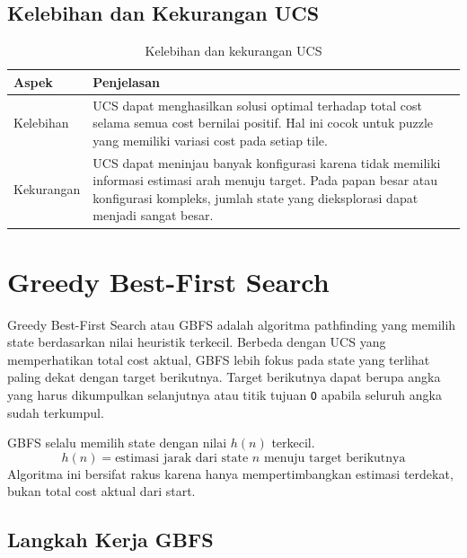 \subsection{Kelebihan dan Kekurangan UCS}

\begin{table}[H]
	\centering
	\caption{Kelebihan dan kekurangan UCS}
	\begin{tabular}{|p{3cm}|p{11cm}|}
		\hline
		\rowcolor{green!15}
		\textbf{Aspek} & \textbf{Penjelasan} \\
		\hline
		Kelebihan & UCS dapat menghasilkan solusi optimal terhadap total cost selama semua cost bernilai positif. Hal ini cocok untuk puzzle yang memiliki variasi cost pada setiap tile. \\
		\hline
		Kekurangan & UCS dapat meninjau banyak konfigurasi karena tidak memiliki informasi estimasi arah menuju target. Pada papan besar atau konfigurasi kompleks, jumlah state yang dieksplorasi dapat menjadi sangat besar. \\
		\hline
	\end{tabular}
\end{table}

\section{Greedy Best-First Search}

Greedy Best-First Search atau GBFS adalah algoritma pathfinding yang memilih state berdasarkan nilai heuristik terkecil. 
Berbeda dengan UCS yang memperhatikan total cost aktual, GBFS lebih fokus pada state yang terlihat paling dekat dengan target berikutnya. 
Target berikutnya dapat berupa angka yang harus dikumpulkan selanjutnya atau titik tujuan \texttt{O} apabila seluruh angka sudah terkumpul.

\begin{tcolorbox}[
	colback=orange!5,
	colframe=orange!70!black,
	title=\textbf{Prinsip GBFS},
	arc=2mm,
	boxrule=0.8pt
]
GBFS selalu memilih state dengan nilai $h(n)$ terkecil.
\[
	h(n) = \text{estimasi jarak dari state } n \text{ menuju target berikutnya}
\]
Algoritma ini bersifat rakus karena hanya mempertimbangkan estimasi terdekat, bukan total cost aktual dari start.
\end{tcolorbox}

\subsection{Langkah Kerja GBFS}

